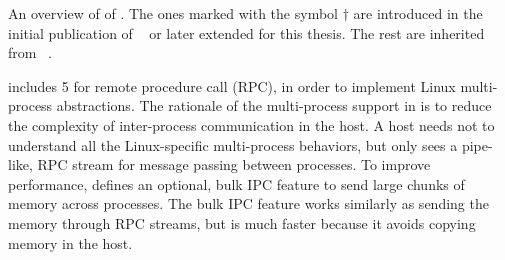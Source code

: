 \begin{table}[htp!]
\centering

\caption{An overview of \thehostabi{} of \graphene{}. The ones marked with the symbol $\dagger$ are introduced in the initial publication of \graphene{}~\cite{tsai14graphene} or later extended for this thesis. The rest are inherited from \drawbridge{}~\cite{porter11drawbridge}.}
\label{tab:overview:abi}
\end{table}




\Thehostabi{} includes 5 \hostapis{} for 
remote procedure call (RPC),
in order to implement Linux multi-process abstractions.
The rationale of the multi-process support in \graphene{} is to reduce the complexity of inter-process communication in the host.
A host needs not to understand all the Linux-specific multi-process behaviors,
but only sees a pipe-like, RPC stream for message passing between processes.
To improve performance,
\thehostabi{} defines an optional, bulk IPC feature
to send large chunks of memory across processes.
The bulk IPC feature works similarly as sending the memory through RPC streams,
but is much faster because it avoids copying memory in the host.


